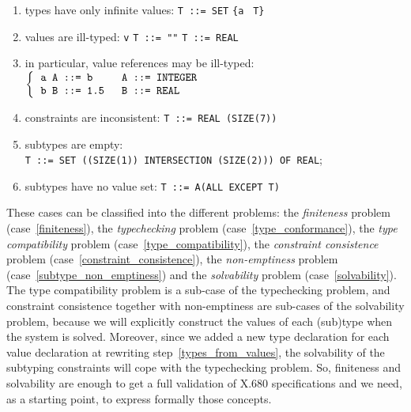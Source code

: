 \begin{enumerate}
  
  \item \label{finiteness} types have only infinite values:
        \texttt{\small T ::= SET} \verb+{+\texttt{a} \texttt{\small
        T}\verb+}+

  \item \label{type_conformance} values are ill-typed:
        \texttt{v} \texttt{\small T ::= ""} \hspace*{6mm}
        \texttt{\small T ::= REAL}

  \item \label{type_compatibility} in particular, value references
        may be ill-typed:\\
        {\small 
        $\left\{
           \begin{tabular}{l}
              \verb+a A ::= b     A ::= INTEGER+\\
              \verb+b B ::= 1.5   B ::= REAL+
           \end{tabular}
        \right.$
        }

  \item \label{constraint_consistence} constraints are
        inconsistent: \texttt{\small T ::= REAL (SIZE(7))}

  \item \label{subtype_non_emptiness} subtypes are empty:\\
     \texttt{\small T ::= SET ((SIZE(1)) INTERSECTION (SIZE(2)))
        OF REAL};
        
  \item \label{solvability} subtypes have no value set:
        \texttt{\small T ::= A(ALL EXCEPT T)}

\end{enumerate}
These cases can be classified into the different problems: the
\emph{finiteness} problem (case~\ref{finiteness}), the
\emph{typechecking} problem (case~\ref{type_conformance}), the
\emph{type compatibility} problem (case~\ref{type_compatibility}), the
\emph{constraint consistence} problem
(case~\ref{constraint_consistence}), the \emph{non-emptiness} problem
(case~\ref{subtype_non_emptiness}) and the \emph{solvability} problem
(case~\ref{solvability}). The type compatibility problem is a sub-case
of the typechecking problem, and constraint consistence together with
non-emptiness are sub-cases of the solvability problem, because we
will explicitly construct the values of each (sub)type when the system
is solved. Moreover, since we added a new type declaration for each
value declaration at rewriting step~\ref{types_from_values}, the
solvability of the subtyping constraints will cope with the
typechecking problem. So, finiteness and solvability are enough to get
a full validation of \mbox{X.680} specifications and we need, as a
starting point, to express formally those concepts.


